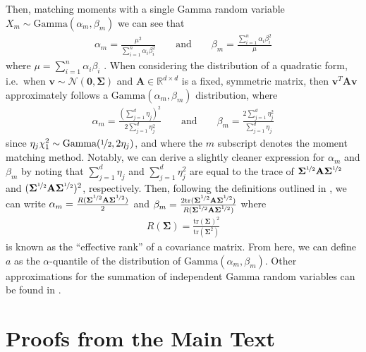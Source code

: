 \documentclass[11pt,twoside]{article}
\theoremstyle{definition}
\theoremstyle{remark}
\begin{document}
Then, matching moments with a single Gamma random variable $X_m \sim \text{Gamma}(\alpha_m, \beta_m)$ we can see that
\begin{align*}
    \alpha_m = \frac{\mu^2}{\sum^n_{i=1}\alpha_i \beta^2_i} \qquad \text{and} \qquad  \beta_m = \frac{\sum^n_{i=1}\alpha_i \beta^2_i}{\mu}
\end{align*}
where $\mu = \sum^n_{i=1} \alpha_i \beta_i$ \citep{covo2014novel}. When considering the distribution of a quadratic form, i.e.\ when $\mathbf{v} \sim \mathcal{N}(\mathbf{0}, \mathbf{\Sigma})$ and $\mathbf{A} \in \mathbb{R}^{d \times d}$ is a fixed, symmetric matrix, then $\mathbf{v}^T \mathbf{A} \mathbf{v}$ approximately follows a $\text{Gamma}(\alpha_m, \beta_m)$ distribution, where
\begin{align*}
    \alpha_m = \frac{\left( \sum^d_{j=1} \eta_j\right)^2}{2 \sum^d_{j=1} \eta^2_j} \qquad \text{and} \qquad \beta_m = \frac{ 2\sum^d_{j=1} \eta^2_j}{\sum^d_{j=1} \eta_j }
\end{align*}
since $\eta_j \chi^2_1 \sim \text{Gamma}(\nicefrac{1}{2}, 2 \eta_j)$, and where the $m$ subscript denotes the moment matching method. Notably, we can derive a slightly cleaner expression for $\alpha_m$ and $\beta_m$ by noting that $\sum^d_{j=1} \eta_j$ and $\sum^d_{j=1} \eta^2_j$ are equal to the trace of $\mathbf{\Sigma}^{\nicefrac{1}{2}} \mathbf{A} \mathbf{\Sigma}^{\nicefrac{1}{2}}$ and $(\mathbf{\Sigma}^{\nicefrac{1}{2}} \mathbf{A} \mathbf{\Sigma}^{\nicefrac{1}{2}})^2$, respectively. Then, following the definitions outlined in \cite{bartlettbenign}, we can write $\alpha_m = \frac{R(\mathbf{\Sigma}^{\nicefrac{1}{2}} \mathbf{A} \mathbf{\Sigma}^{\nicefrac{1}{2}})}{2}$ and $\beta_m = \frac{2 \text{tr}(\mathbf{\Sigma}^{\nicefrac{1}{2}} \mathbf{A} \mathbf{\Sigma}^{\nicefrac{1}{2}})}{R(\mathbf{\Sigma}^{\nicefrac{1}{2}} \mathbf{A} \mathbf{\Sigma}^{\nicefrac{1}{2}})}$ where
\begin{align*}
    R(\mathbf{\Sigma}) = \frac{\text{tr}(\mathbf{\Sigma})^2}{\text{tr}(\mathbf{\Sigma}^2)} 
\end{align*}
is known as the ``effective rank'' of a covariance matrix. From here, we can define $a$ as the $\alpha$-quantile of the distribution of $\text{Gamma}(\alpha_m, \beta_m)$. Other approximations for the summation of independent Gamma random variables can be found in \cite{bodenham2016comparison}.



\section{Proofs from the Main Text} \label{proofs_section}
\end{document}
